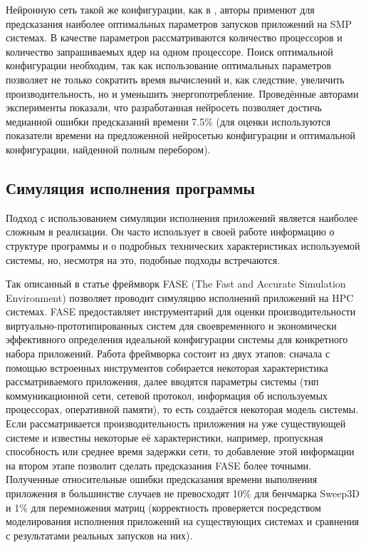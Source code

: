 		Нейронную сеть такой же конфигурации, как в \cite{ML_SMG2000}, авторы \cite{ML_PROC_KERN} применют для предсказания наиболее оптимальных параметров запусков приложений на SMP системах. В качестве параметров рассматриваются количество процессоров и количество запрашиваемых ядер на одном процессоре. Поиск оптимальной конфигурации необходим, так как использование оптимальных параметров позволяет не только сократить время вычислений и, как следствие, увеличить производительность, но и уменьшить энергопотребление. Проведённые авторами эксперименты показали, что разработанная нейросеть позволяет достичь медианной ошибки предсказаний времени 7.5\% (для оценки используются показатели времени на предложенной нейросетью конфигурации и оптимальной конфигурации, найденной полным перебором).

	\subsection{Симуляция исполнения программы}
		Подход с использованием симуляции исполнения приложений является наиболее сложным в реализации. Он часто использует в своей работе информацию о структуре программы и о подробных технических характеристиках используемой системы, но, несмотря на это, подобные подходы встречаются.

		Так описанный в статье \cite{simulation_FASE} фреймворк FASE (The Fast and Accurate Simulation Environment) позволяет проводит симуляцию исполнений приложений на HPC системах. FASE предоставляет инструментарий для оценки производительности виртуально-прототипированных систем для своевременного и экономически эффективного определения идеальной конфигурации системы для конкретного набора приложений. Работа фреймворка состоит из двух этапов: сначала с помощью встроенных инструментов собирается некоторая характеристика рассматриваемого приложения, далее вводятся параметры системы (тип коммуникационной сети, сетевой протокол, информация об используемых процессорах, оперативной памяти), то есть создаётся некоторая модель системы. Если рассматривается производительность приложения на уже существующей системе и известны некоторые её характеристики, например, пропускная способность или среднее время задержки сети, то добавление этой информации на втором этапе позволит сделать предсказания FASE более точными. Полученные относительные ошибки предсказания времени выполнения приложения в большинстве случаев не превосходят 10\% для бенчмарка Sweep3D и 1\% для перемножения матриц (корректность проверяется посредством моделирования исполнения приложений на существующих системах и сравнения с результатами реальных запусков на них).
		

